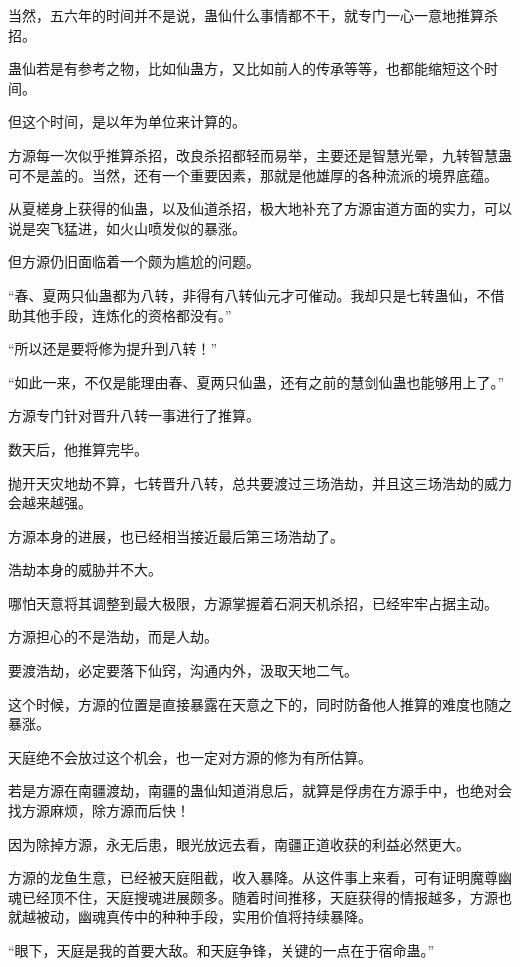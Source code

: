 \begin{this_body}
当然，五六年的时间并不是说，蛊仙什么事情都不干，就专门一心一意地推算杀招。

蛊仙若是有参考之物，比如仙蛊方，又比如前人的传承等等，也都能缩短这个时间。

但这个时间，是以年为单位来计算的。

方源每一次似乎推算杀招，改良杀招都轻而易举，主要还是智慧光晕，九转智慧蛊可不是盖的。当然，还有一个重要因素，那就是他雄厚的各种流派的境界底蕴。

从夏槎身上获得的仙蛊，以及仙道杀招，极大地补充了方源宙道方面的实力，可以说是突飞猛进，如火山喷发似的暴涨。

但方源仍旧面临着一个颇为尴尬的问题。

“春、夏两只仙蛊都为八转，非得有八转仙元才可催动。我却只是七转蛊仙，不借助其他手段，连炼化的资格都没有。”

“所以还是要将修为提升到八转！”

“如此一来，不仅是能理由春、夏两只仙蛊，还有之前的慧剑仙蛊也能够用上了。”

方源专门针对晋升八转一事进行了推算。

数天后，他推算完毕。

抛开天灾地劫不算，七转晋升八转，总共要渡过三场浩劫，并且这三场浩劫的威力会越来越强。

方源本身的进展，也已经相当接近最后第三场浩劫了。

浩劫本身的威胁并不大。

哪怕天意将其调整到最大极限，方源掌握着石洞天机杀招，已经牢牢占据主动。

方源担心的不是浩劫，而是人劫。

要渡浩劫，必定要落下仙窍，沟通内外，汲取天地二气。

这个时候，方源的位置是直接暴露在天意之下的，同时防备他人推算的难度也随之暴涨。

天庭绝不会放过这个机会，也一定对方源的修为有所估算。

若是方源在南疆渡劫，南疆的蛊仙知道消息后，就算是俘虏在方源手中，也绝对会找方源麻烦，除方源而后快！

因为除掉方源，永无后患，眼光放远去看，南疆正道收获的利益必然更大。

方源的龙鱼生意，已经被天庭阻截，收入暴降。从这件事上来看，可有证明魔尊幽魂已经顶不住，天庭搜魂进展颇多。随着时间推移，天庭获得的情报越多，方源也就越被动，幽魂真传中的种种手段，实用价值将持续暴降。

“眼下，天庭是我的首要大敌。和天庭争锋，关键的一点在于宿命蛊。”


\end{this_body}
